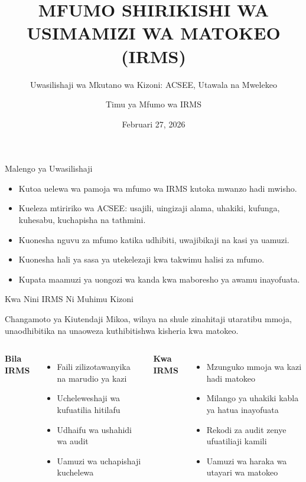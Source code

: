 \documentclass[aspectratio=169,11pt]{beamer}
\title{MFUMO SHIRIKISHI WA USIMAMIZI WA MATOKEO (IRMS)}
\subtitle{Uwasilishaji wa Mkutano wa Kizoni: ACSEE, Utawala na Mwelekeo}
\author{Timu ya Mfumo wa IRMS}
\institute{PMO-RALG | Uendeshaji wa Mitihani}
\date{Februari 27, 2026}
\begin{document}
\begin{frame}
  \titlepage
\end{frame}

\begin{frame}{Malengo ya Uwasilishaji}
\begin{itemize}
  \item Kutoa uelewa wa pamoja wa mfumo wa IRMS kutoka mwanzo hadi mwisho.
  \item Kueleza mtiririko wa ACSEE: usajili, uingizaji alama, uhakiki, kufunga, kuhesabu, kuchapisha na tathmini.
  \item Kuonesha nguvu za mfumo katika udhibiti, uwajibikaji na kasi ya uamuzi.
  \item Kuonesha hali ya sasa ya utekelezaji kwa takwimu halisi za mfumo.
  \item Kupata maamuzi ya uongozi wa kanda kwa maboresho ya awamu inayofuata.
\end{itemize}
\end{frame}

\begin{frame}{Kwa Nini IRMS Ni Muhimu Kizoni}
\begin{block}{Changamoto ya Kiutendaji}
Mikoa, wilaya na shule zinahitaji utaratibu mmoja, unaodhibitika na unaoweza kuthibitishwa kisheria kwa matokeo.
\end{block}

\begin{columns}[T]
\textbf{Bila IRMS}
\begin{itemize}
  \item Faili zilizotawanyika na marudio ya kazi
  \item Ucheleweshaji wa kufuatilia hitilafu
  \item Udhaifu wa ushahidi wa audit
  \item Uamuzi wa uchapishaji kuchelewa
\end{itemize}

\textbf{Kwa IRMS}
\begin{itemize}
  \item Mzunguko mmoja wa kazi hadi matokeo
  \item Milango ya uhakiki kabla ya hatua inayofuata
  \item Rekodi za audit zenye ufuatiliaji kamili
  \item Uamuzi wa haraka wa utayari wa matokeo
\end{itemize}
\end{columns}
\end{frame}
\end{document}
